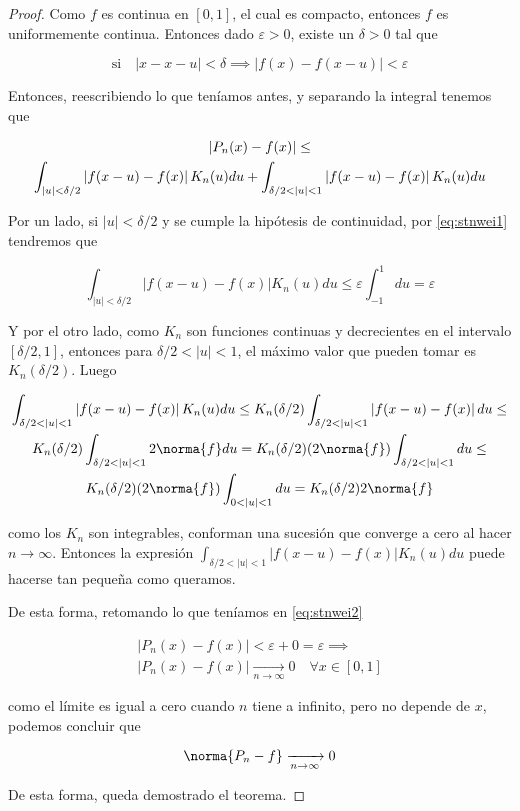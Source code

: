 \begin{proof}
    Como $f$ es continua en $[0,1]$, el cual es compacto, entonces $f$ es uniformemente continua. Entonces dado $\varepsilon > 0$, existe un $\delta > 0$ tal que
    
    \begin{equation}\label{eq:stnwei1}
        \text{si} \quad |x-x-u| < \delta \implies |f(x) - f(x-u)| < \varepsilon
    \end{equation}
    
    Entonces, reescribiendo lo que teníamos antes, y separando la integral tenemos que
    
    \begin{gather}\label{eq:stnwei2}
        |P_n(x) - f(x)| \leq \notag \\
        \int_{|u| < \delta/2} \left|f(x-u) - f(x)\right|K_n(u)du + \int_{\delta/2 < |u| < 1} \left|f(x-u) - f(x)\right|K_n(u)du
    \end{gather}
    
    Por un lado, si $|u| < \delta/2$ y se cumple la hipótesis de continuidad, por \ref{eq:stnwei1} tendremos que
    
    \[
    \int_{|u| < \delta/2} \left|f(x-u) - f(x)\right|K_n(u)du \leq \varepsilon \int_{-1}^1 du = \varepsilon
    \]
    
    Y por el otro lado, como $K_n$ son funciones continuas y decrecientes en el intervalo $[\delta/2, 1]$, entonces para $\delta/2 < |u| < 1$, el máximo valor que pueden tomar es $K_n(\delta/2)$. Luego
    
    \begin{gather*}
        \int_{\delta/2 < |u| < 1} \left|f(x-u) - f(x)\right|K_n(u)du \leq K_n(\delta/2)\int_{\delta/2 < |u| < 1} \left|f(x-u) - f(x)\right|du \leq \\
        K_n(\delta/2)\int_{\delta/2 < |u| < 1} 2\norma{f}du = K_n(\delta/2)(2\norma{f})\int_{\delta/2 < |u| < 1}du \leq \\
        K_n(\delta/2)(2\norma{f})\int_{0 < |u| < 1}du = K_n(\delta/2)2\norma{f}
    \end{gather*}
    
    \noindent como los $K_n$ son integrables, conforman una sucesión que converge a cero al hacer $n \rightarrow \infty$. Entonces la expresión $\int_{\delta/2 < |u| < 1} \left|f(x-u) - f(x)\right|K_n(u)du$ puede hacerse tan pequeña como queramos.
    
    De esta forma, retomando lo que teníamos en \ref{eq:stnwei2}
    
    \begin{gather*}
        |P_n(x) - f(x)| < \varepsilon + 0 = \varepsilon \implies \\
        |P_n(x) - f(x)| \xrightarrow[n \to \infty]{} 0 \quad \forall x \in [0,1]
    \end{gather*}
    
    \noindent como el límite es igual a cero cuando $n$ tiene a infinito, pero no depende de $x$, podemos concluir que
    
    \[
    \norma{P_n - f} \xrightarrow[n \to \infty]{} 0
    \]
    
    De esta forma, queda demostrado el teorema.
\end{proof}